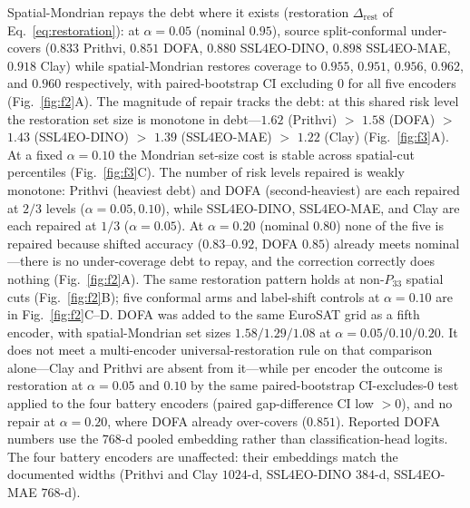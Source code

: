 \documentclass[preprint,11pt,authoryear]{elsarticle}
\begin{document}
Spatial-Mondrian repays the debt where it exists (restoration $\Delta_{\mathrm{rest}}$ of
Eq.~\eqref{eq:restoration}): at $\alpha=0.05$ (nominal $0.95$), source
split-conformal under-covers ($0.833$ Prithvi, $0.851$ DOFA, $0.880$ SSL4EO-DINO, $0.898$ SSL4EO-MAE, $0.918$ Clay)
while spatial-Mondrian restores coverage to $0.955$, $0.951$, $0.956$, $0.962$, and $0.960$ respectively,
with paired-bootstrap CI excluding $0$ for all five encoders (Fig.~\ref{fig:f2}A). The magnitude of repair tracks the debt:
at this shared risk level the restoration set size is monotone in debt---$1.62$ (Prithvi) $>$ $1.58$ (DOFA) $>$ $1.43$
(SSL4EO-DINO) $>$ $1.39$ (SSL4EO-MAE) $>$ $1.22$ (Clay) (Fig.~\ref{fig:f3}A). At a fixed $\alpha{=}0.10$ the Mondrian set-size cost is stable across spatial-cut percentiles (Fig.~\ref{fig:f3}C).
The number of risk levels repaired is weakly monotone: Prithvi (heaviest debt) and DOFA (second-heaviest) are each repaired at $2/3$
levels ($\alpha=0.05,0.10$), while SSL4EO-DINO, SSL4EO-MAE, and Clay are each repaired at $1/3$ ($\alpha=0.05$). At
$\alpha=0.20$ (nominal $0.80$) none of the five is repaired because shifted accuracy ($0.83$--$0.92$, DOFA $0.85$) already meets
nominal---there is no under-coverage debt to repay, and the correction correctly does nothing
(Fig.~\ref{fig:f2}A). The same restoration pattern holds at non-$P_{33}$ spatial cuts (Fig.~\ref{fig:f2}B); five conformal arms and label-shift controls at $\alpha{=}0.10$ are in Fig.~\ref{fig:f2}C--D. DOFA was added to the same EuroSAT grid as a fifth encoder, with spatial-Mondrian set sizes
$1.58/1.29/1.08$ at $\alpha=0.05/0.10/0.20$. It does not meet a multi-encoder universal-restoration
rule on that comparison alone---Clay and Prithvi are absent from it---while per encoder the outcome is
restoration at $\alpha=0.05$ and $0.10$ by the same paired-bootstrap CI-excludes-$0$ test applied to
the four battery encoders (paired gap-difference CI low $>0$), and no repair at $\alpha=0.20$, where DOFA already
over-covers ($0.851$). Reported DOFA numbers use the $768$-d pooled embedding rather than
classification-head logits. The four battery encoders are
unaffected: their embeddings match the documented widths (Prithvi and Clay
$1024$-d, SSL4EO-DINO $384$-d, SSL4EO-MAE $768$-d).
\end{document}
